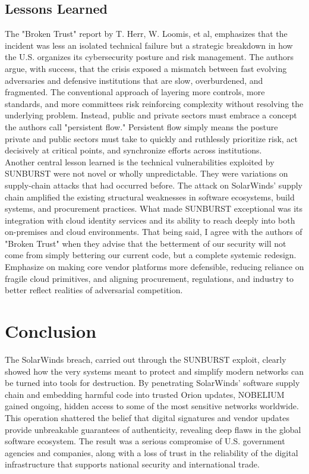 \documentclass[conference]{IEEEtran}
\begin{document}
    \subsection{Lessons Learned}
    The "Broken Trust" report by T. Herr, W. Loomis, et al\cite{BrokenTrustHerrEtAl}, emphasizes that the incident was less an isolated
    technical failure but a strategic breakdown in how the U.S. organizes its cybersecurity posture and risk management.
    The authors argue, with success, that the crisis exposed a mismatch between fast evolving adversaries
    and defensive institutions that are slow, overburdened, and fragmented. The conventional approach of layering
    more controls, more standards, and more committees risk reinforcing complexity without resolving the underlying problem.
    Instead, public and private sectors must embrace a concept the authors call "persistent flow." Persistent flow simply means the posture
    private and public sectors must take to quickly and ruthlessly prioritize risk, act decisively at critical points, and synchronize efforts
    across institutions.\\
    Another central lesson learned is the technical vulnerabilities exploited by SUNBURST were not novel or wholly
    unpredictable. They were variations on supply-chain attacks that had occurred before. The attack on SolarWinds'
    supply chain amplified the existing structural weaknesses in software ecosystems, build systems, and procurement
    practices. What made SUNBURST exceptional was its integration with cloud identity services and its ability
    to reach deeply into both on-premises and cloud environments. That being said, I agree with the authors of
    "Broken Trust" when they advise that the betterment of our security will not come from simply bettering our current 
    code, but a complete systemic redesign. Emphasize on making core vendor platforms more defensible, reducing reliance
    on fragile cloud primitives, and aligning procurement, regulations, and industry to better reflect realities of adversarial
    competition.

\section{Conclusion}
The SolarWinds breach, carried out through the SUNBURST exploit, clearly showed how the very systems meant to protect and simplify 
modern networks can be turned into tools for destruction. By penetrating SolarWinds’ software supply chain and embedding harmful 
code into trusted Orion updates, NOBELIUM gained ongoing, hidden access to some of the most sensitive networks worldwide. This 
operation shattered the belief that digital signatures and vendor updates provide unbreakable guarantees of authenticity, revealing 
deep flaws in the global software ecosystem. The result was a serious compromise of U.S. government agencies and companies, along 
with a loss of trust in the reliability of the digital infrastructure that supports national security and international trade.
\end{document}
